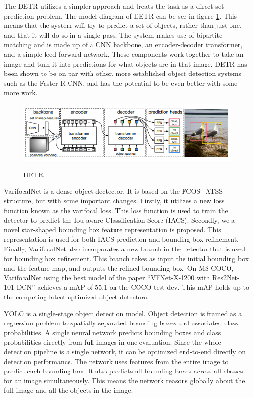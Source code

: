 \documentclass[conference]{IEEEtran}
\begin{document}
The DETR \cite{2} utilizes a simpler approach and treats the task as a direct set prediction problem. The model diagram of DETR can be see in figure \ref{fig5}. This means that the system will try to predict a set of objects, rather than just one, and that it will do so in a single pass. The system makes use of bipartite matching and is made up of a CNN backbone, an encoder-decoder transformer, and a simple feed forward network. These components work together to take an image and turn it into predictions for what objects are in that image. DETR has been shown to be on par with other, more established object detection systems such as the Faster R-CNN, and has the potential to be even better with some more work. 
\begin{figure}[h]
    \centering
    \includegraphics[width=\linewidth]{2..png}\\
    \caption{DETR}
    \label{fig5}
\end{figure}
\newline
VarifocalNet \cite{4} is a dense object dectector. It is based on the FCOS+ATSS structure, but with some important changes. Firstly, it utilizes a new loss function known as the varifocal loss. This loss function is used to train the detector to predict the Iou-aware Classification Score (IACS). Secondly, we a novel star-shaped bounding box feature representation is proposed. This representation is used for both IACS prediction and bounding box refinement. Finally, VarifocalNet also incorporates a new branch in the detector that is used for bounding box refinement. This branch takes as input the initial bounding box and the feature map, and outputs the refined bounding box. On MS COCO, VarifocalNet using the best model of the paper ``VFNet-X-1200 with Res2Net-101-DCN'' achieves a mAP of 55.1 on the COCO test-dev. This mAP holds up to the competing latest optimized object detectors.


YOLO \cite{DBLP:journals/corr/RedmonDGF15} is a single-stage object detection model. Object detection is framed as a regression problem to spatially separated bounding boxes and associated class probabilities. A single neural network predicts bounding boxes and class probabilities directly from full images in one evaluation. Since the whole detection pipeline is a single network, it can be optimized end-to-end directly on detection performance. The network uses features from the entire image to predict each bounding box. It also predicts all bounding boxes across all classes for an image simultaneously. This means the network reasons globally about the full image and all the objects in the image.
\end{document}
